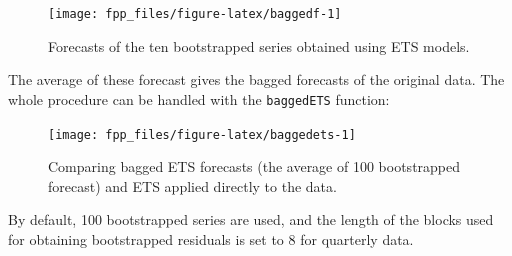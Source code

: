 \documentclass[]{book}
\newenvironment{Shaded}{\begin{snugshade}}{\end{snugshade}}
\newcommand{\DataTypeTok}[1]{\textcolor[rgb]{0.13,0.29,0.53}{#1}}
\newcommand{\DecValTok}[1]{\textcolor[rgb]{0.00,0.00,0.81}{#1}}
\newcommand{\KeywordTok}[1]{\textcolor[rgb]{0.13,0.29,0.53}{\textbf{#1}}}
\newcommand{\NormalTok}[1]{#1}
\newcommand{\OperatorTok}[1]{\textcolor[rgb]{0.81,0.36,0.00}{\textbf{#1}}}
\newcommand{\StringTok}[1]{\textcolor[rgb]{0.31,0.60,0.02}{#1}}
\begin{document}
\begin{figure}

{\centering \texttt{[image: fpp\_files/figure-latex/baggedf-1]} 

}

\caption{Forecasts of the ten bootstrapped series obtained using ETS models.}\label{fig:baggedf}
\end{figure}

The average of these forecast gives the bagged forecasts of the original data. The whole procedure can be handled with the \texttt{baggedETS} function:

\begin{Shaded}
\end{Shaded}

\begin{figure}

{\centering \texttt{[image: fpp\_files/figure-latex/baggedets-1]} 

}

\caption{Comparing bagged ETS forecasts (the average of 100 bootstrapped forecast) and ETS applied directly to the data.}\label{fig:baggedets}
\end{figure}

By default, 100 bootstrapped series are used, and the length of the blocks used for obtaining bootstrapped residuals is set to 8 for quarterly data.
\end{document}
